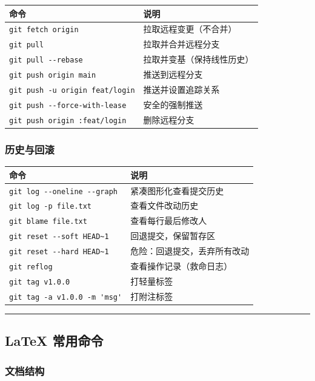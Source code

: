 \begin{center}
\begin{tabular}{ll}
\toprule
命令 & 说明 \\
\midrule
\verb|git fetch origin| & 拉取远程变更（不合并） \\
\verb|git pull| & 拉取并合并远程分支 \\
\verb|git pull --rebase| & 拉取并变基（保持线性历史） \\
\verb|git push origin main| & 推送到远程分支 \\
\verb|git push -u origin feat/login| & 推送并设置追踪关系 \\
\verb|git push --force-with-lease| & 安全的强制推送 \\
\verb|git push origin :feat/login| & 删除远程分支 \\
\bottomrule
\end{tabular}
\end{center}

\subsubsection{历史与回滚}

\begin{center}
\begin{tabular}{ll}
\toprule
命令 & 说明 \\
\midrule
\verb|git log --oneline --graph| & 紧凑图形化查看提交历史 \\
\verb|git log -p file.txt| & 查看文件改动历史 \\
\verb|git blame file.txt| & 查看每行最后修改人 \\
\verb|git reset --soft HEAD~1| & 回退提交，保留暂存区 \\
\verb|git reset --hard HEAD~1| & 危险：回退提交，丢弃所有改动 \\
\verb|git reflog| & 查看操作记录（救命日志） \\
\verb|git tag v1.0.0| & 打轻量标签 \\
\verb|git tag -a v1.0.0 -m 'msg'| & 打附注标签 \\
\bottomrule
\end{tabular}
\end{center}

\hrule

\subsection{LaTeX 常用命令}

\subsubsection{文档结构}

